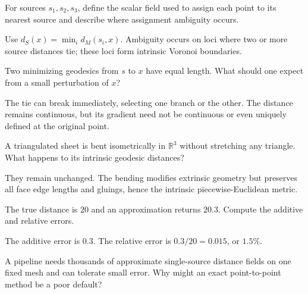 \begin{problem}\label{prob:vii38-08}
For sources \(s_1,s_2,s_3\), define the scalar field used to assign each point to its nearest source and describe where assignment ambiguity occurs.
\end{problem}

\begin{solution}
Use \(d_S(x)=\min_i d_M(s_i,x)\).  Ambiguity occurs on loci where two or more source distances tie; these loci form intrinsic Voronoi boundaries.
\end{solution}

\begin{problem}\label{prob:vii38-09}
Two minimizing geodesics from \(s\) to \(x\) have equal length.  What should one expect from a small perturbation of \(x\)?
\end{problem}

\begin{solution}
The tie can break immediately, selecting one branch or the other.  The distance remains continuous, but its gradient need not be continuous or even uniquely defined at the original point.
\end{solution}

\begin{problem}\label{prob:vii38-10}
A triangulated sheet is bent isometrically in \(\mathbb R^3\) without stretching any triangle.  What happens to its intrinsic geodesic distances?
\end{problem}

\begin{solution}
They remain unchanged.  The bending modifies extrinsic geometry but preserves all face edge lengths and gluings, hence the intrinsic piecewise-Euclidean metric.
\end{solution}

\begin{problem}\label{prob:vii38-11}
The true distance is \(20\) and an approximation returns \(20.3\).  Compute the additive and relative errors.
\end{problem}

\begin{solution}
The additive error is \(0.3\).  The relative error is \(0.3/20=0.015\), or \(1.5\%\).
\end{solution}

\begin{problem}\label{prob:vii38-12}
A pipeline needs thousands of approximate single-source distance fields on one fixed mesh and can tolerate small error.  Why might an exact point-to-point method be a poor default?
\end{problem}


